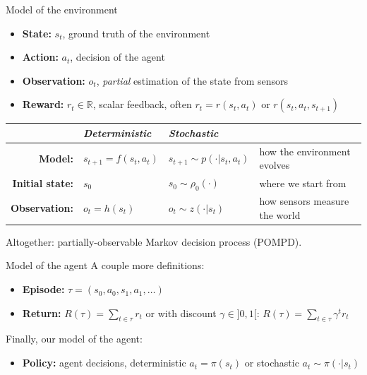 \documentclass[11pt, aspectratio=169]{beamer}
\begin{document}
\begin{frame}{Model of the environment}
    \begin{itemize}
        \item \textbf{State:} $s_t$, ground truth of the environment
        \item \textbf{Action:} $a_t$, decision of the agent
        \item \textbf{Observation:} $o_t$, \emph{partial} estimation of the state from sensors
        \item \textbf{Reward:} $r_t \in \mathbb{R}$, scalar feedback, often $r_t = r(s_t, a_t)$ or $r(s_t, a_t, s_{t+1})$
    \end{itemize}
    \vspace{-1em}
    \begin{table}
        \begin{tabular}{rlll}
            & \emph{Deterministic} & \emph{Stochastic} \\
            \hline
            \textbf{Model:} & $s_{t+1} = f(s_t, a_t)$ & $s_{t+1} \sim p(\cdot | s_t, a_t)$ & how the environment evolves \\
            \textbf{Initial state:} & $s_0$ & $s_0 \sim \rho_0(\cdot)$ & where we start from \\
            \textbf{Observation:} & $o_t = h(s_t)$ & $o_t \sim z(\cdot | s_t)$ & how sensors measure the world
        \end{tabular}
    \end{table}
    Altogether: partially-observable Markov decision process (POMPD).
\end{frame}

\begin{frame}{Model of the agent}
    A couple more definitions:
    \begin{itemize}
        \item \textbf{Episode:} $\tau = (s_0, a_0, s_1, a_1, \ldots)$
        \item \textbf{Return:} $R(\tau) = \sum_{t \in \tau} r_t$ or with discount $\gamma \in ]0, 1[$: $R(\tau) = \sum_{t \in \tau} \gamma^t r_t$
    \end{itemize}
    Finally, our model of the agent:
    \begin{itemize}
        \item \textbf{Policy:} agent decisions, deterministic $a_t = \pi(s_t)$ or stochastic $a_t \sim \pi(\cdot | s_t)$
    \end{itemize}
\end{frame}
\end{document}
